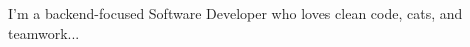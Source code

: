\documentclass[11pt]{article}
\begin{document}

\vspace{1em}

I'm a backend-focused Software Developer who loves clean code, cats, and teamwork...

\vspace{1em}



\vspace{0.5em}




\vspace{1em}



\end{document}
